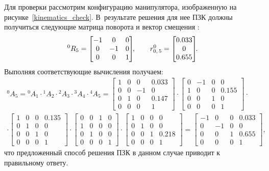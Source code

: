 Для проверки рассмотрим конфигурацию манипулятора, изображенную на рисунке~\ref{kinematics_check}.
В~результате решения для нее ПЗК должны получиться следующие матрица поворота и вектор смещения :
\begin{equation}
	{}^{0}R_5 =
	\begin{bmatrix}
		-1 &  0 & 0\\
		 0 & -1 & 0\\
		 0 &  0 & 1
	\end{bmatrix}\!\!,
	\qquad
	r^{0}_{0,\,5} =
	\begin{bmatrix}
		0.033\\
		0\\
		0.655
	\end{bmatrix}\!\!\ldotp
\end{equation}
Выполняя соответствующие вычисления получаем:
\begin{multline}
    {}^{0}A_5 = {}^{0}A_1 \cdot {}^{1}A_2 \cdot {}^{2}A_3 \cdot {}^{3}A_4 \cdot {}^{4}A_5 =
    \begin{bmatrix}
        1 & 0 &  0 & 0.033\\
        0 & 0 & -1 &     0\\
        0 & 1 &  0 & 0.147\\
        0 & 0 &  0 &     1
    \end{bmatrix}
    \cdot
    \begin{bmatrix}
        0 & -1 &  0 &     0\\
        1 &  0 &  0 & 0.155\\
        0 &  0 &  1 &     0\\
        0 &  0 &  0 &     1
    \end{bmatrix}
    \cdot \\ \cdot
    \begin{bmatrix}
        1 & 0 &  0 & 0.135\\
        0 & 1 &  0 &     0\\
        0 & 0 &  1 &     0\\
        0 & 0 &  0 &     1
    \end{bmatrix}
    \cdot
    \begin{bmatrix}
        0 & 0 & 1 & 0\\
        1 & 0 & 0 & 0\\
        0 & 1 & 0 & 0\\
        0 & 0 & 0 & 1
    \end{bmatrix}
    \cdot
     \begin{bmatrix}
        1 & 0 &  0 &     0\\
        0 & 1 &  0 &     0\\
        0 & 0 &  1 & 0.218\\
        0 & 0 &  0 &     1
    \end{bmatrix}
    =
    \left[\begin{matrix}-1 & 0 & 0 & 0.033\\0 & -1 & 0 & 0\\0 & 0 & 1 & 0.655\\0 & 0 & 0 & 1\end{matrix}\right]\!\!,
\end{multline}
что предложенный способ решения ПЗК в данном случае приводит к правильному ответу.

